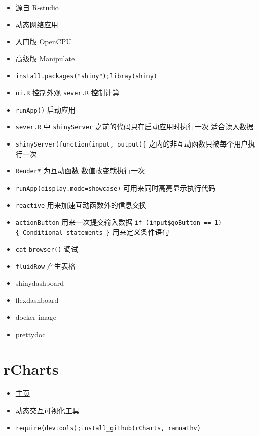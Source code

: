 \documentclass[
]{book}
\providecommand{\tightlist}{%
  \setlength{\itemsep}{0pt}\setlength{\parskip}{0pt}}
\begin{document}
\begin{itemize}
\tightlist
\item
  源自 R-studio
\item
  动态网络应用
\item
  入门版 \href{https://www.opencpu.org/}{OpenCPU}
\item
  高级版 \href{https://support.rstudio.com/hc/en-us/articles/200551906-Interactive-Plotting-with-Manipulate}{Manipulate}
\item
  \texttt{install.packages("shiny");libray(shiny)}
\item
  \texttt{ui.R} 控制外观 \texttt{sever.R} 控制计算
\item
  \texttt{runApp()} 启动应用
\item
  \texttt{sever.R} 中 \texttt{shinyServer} 之前的代码只在启动应用时执行一次 适合读入数据
\item
  \texttt{shinyServer(function(input,\ output)\{} 之内的非互动函数只被每个用户执行一次
\item
  \texttt{Render*} 为互动函数 数值改变就执行一次
\item
  \texttt{runApp(display.mode=\textquotesingle{}showcase\textquotesingle{})} 可用来同时高亮显示执行代码
\item
  \texttt{reactive} 用来加速互动函数外的信息交换
\item
  \texttt{actionButton} 用来一次提交输入数据 \texttt{if\ (input\$goButton\ ==\ 1)\{\ Conditional\ statements\ \}} 用来定义条件语句
\item
  \texttt{cat} \texttt{browser()} 调试
\item
  \texttt{fluidRow} 产生表格
\item
  shinydashboard
\item
  flexdashboard
\item
  docker image
\item
  \href{https://github.com/yixuan/prettydoc}{prettydoc}
\end{itemize}

\hypertarget{rcharts}{%
\section{rCharts}\label{rcharts}}

\begin{itemize}
\tightlist
\item
  \href{http://ramnathv.github.io/rCharts/}{主页}
\item
  动态交互可视化工具
\item
  \texttt{require(devtools);install\_github(\textquotesingle{}rCharts\textquotesingle{},\ \textquotesingle{}ramnathv\textquotesingle{})}
\end{itemize}
\end{document}
